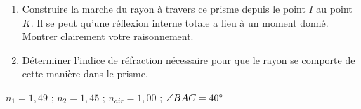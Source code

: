 \documentclass[11pt,a4paper]{article}
\begin{document}
\begin{enumerate}
    \item Construire la marche du rayon à travers ce prisme depuis le point $I$ au point $K$. Il se peut qu'une réflexion interne totale a lieu à un moment donné. Montrer clairement votre raisonnement.
    \item Déterminer l'indice de réfraction nécessaire pour que le rayon se comporte de cette manière dans le prisme. 
\end{enumerate}

\begin{tcolorbox}[title=Données]
$n_1=1,49$ \quad ; \quad $n_2=1,45$ \quad ; \quad $n_{air}=1,00$ \quad ; \quad $\angle BAC = 40\degree$  
\end{tcolorbox}

\endgroup
\end{document}
